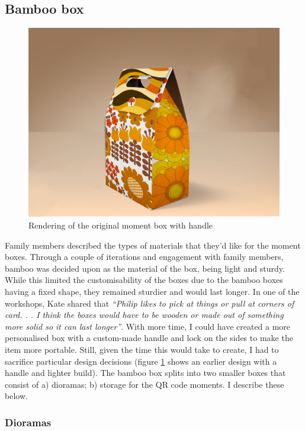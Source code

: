 \subsection{Bamboo box}
\label{Bamboo box}

\begin{figure}[htp]
\centering
\includegraphics[width=.6\linewidth]{Images/ChapterFour/originalDesign.png}
\caption{Rendering of the original moment box with handle}
\label{fig:oldDesign}
\end{figure}
Family members described the types of materials that they'd like for the moment boxes. Through a couple of iterations and engagement with family members, bamboo was decided upon as the material of the box, being light and sturdy. While this limited the customisability of the boxes due to the bamboo boxes having a fixed shape, they remained sturdier and would last longer. In one of the workshops, Kate shared that \textit{``Philip likes to pick at things or pull at corners of card. . . I think the boxes would have to be wooden or made out of something more solid so it can last longer''}. With more time, I could have created a more personalised box with a custom-made handle and lock on the sides to make the item more portable. Still, given the time this would take to create, I had to sacrifice particular design decisions (figure \ref{fig:oldDesign} shows an earlier design with a handle and lighter build). The bamboo box splits into two smaller boxes that consist of a) dioramas; b) storage for the QR code moments. I describe these below.

\subsubsection{Dioramas}
\label{Dioramas}

